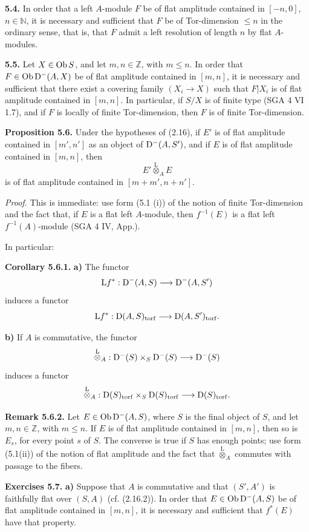 \documentclass[11pt]{article}
\begin{document}
\textbf{5.4.} In order that a left \(A\)-module \(F\) be of flat amplitude contained in \([-n,0]\), \(n\in\mathbb N\), it is necessary and sufficient that \(F\) be of Tor-dimension \(\leq n\) in the ordinary sense, that is, that \(F\) admit a left resolution of length \(n\) by flat \(A\)-modules.

\textbf{5.5.} Let \(X\in\operatorname{Ob} S\), and let \(m,n\in\mathbb Z\), with \(m\leq n\). In order that \(F\in\operatorname{Ob}\mathrm D^-(A,X)\) be of flat amplitude contained in \([m,n]\), it is necessary and sufficient that there exist a covering family \((X_i\to X)\) such that \(F|X_i\) is of flat amplitude contained in \([m,n]\). In particular, if \(S/X\) is of finite type (SGA 4 VI 1.7), and if \(F\) is locally of finite Tor-dimension, then \(F\) is of finite Tor-dimension.

\textbf{Proposition 5.6.} Under the hypotheses of (2.16), if \(E'\) is of flat amplitude contained in \([m',n']\) as an object of \(\mathrm D^-(A,S')\), and if \(E\) is of flat amplitude contained in \([m,n]\), then
\[
  E'\overset{\mathrm L}{\otimes}_A E
\]
is of flat amplitude contained in \([m+m',n+n']\).

\emph{Proof.} This is immediate: use form (5.1 (i)) of the notion of finite Tor-dimension and the fact that, if \(E\) is a flat left \(A\)-module, then \(f^{-1}(E)\) is a flat left \(f^{-1}(A)\)-module (SGA 4 IV, App.).

In particular:

\textbf{Corollary 5.6.1.} \textbf{a)} The functor
\[
  \mathrm L f^*:\mathrm D^-(A,S)\longrightarrow \mathrm D^-(A,S')
\]
induces a functor
\[
  \mathrm L f^*:\mathrm D(A,S)_{\operatorname{torf}}\longrightarrow \mathrm D(A,S')_{\operatorname{torf}}.
\]

\textbf{b)} If \(A\) is commutative, the functor
\[
  \overset{\mathrm L}{\otimes}_A:
  \mathrm D^-(S)\times_S\mathrm D^-(S)\longrightarrow \mathrm D^-(S)
\]
induces a functor
\[
  \overset{\mathrm L}{\otimes}_A:
  \mathrm D(S)_{\operatorname{torf}}\times_S\mathrm D(S)_{\operatorname{torf}}
  \longrightarrow \mathrm D(S)_{\operatorname{torf}}.
\]

\textbf{Remark 5.6.2.} Let \(E\in\operatorname{Ob}\mathrm D^-(A,S)\), where \(S\) is the final object of \(S\), and let \(m,n\in\mathbb Z\), with \(m\leq n\). If \(E\) is of flat amplitude contained in \([m,n]\), then so is \(E_s\), for every point \(s\) of \(S\). The converse is true if \(S\) has enough points; use form (5.1(ii)) of the notion of flat amplitude and the fact that \(\overset{\mathrm L}{\otimes}_A\) commutes with passage to the fibers.

\textbf{Exercises 5.7.} \textbf{a)} Suppose that \(A\) is commutative and that \((S',A')\) is faithfully flat over \((S,A)\) (cf. (2.16.2)). In order that \(E\in\operatorname{Ob}\mathrm D^-(A,S)\) be of flat amplitude contained in \([m,n]\), it is necessary and sufficient that \(f^*(E)\) have that property.
\end{document}
